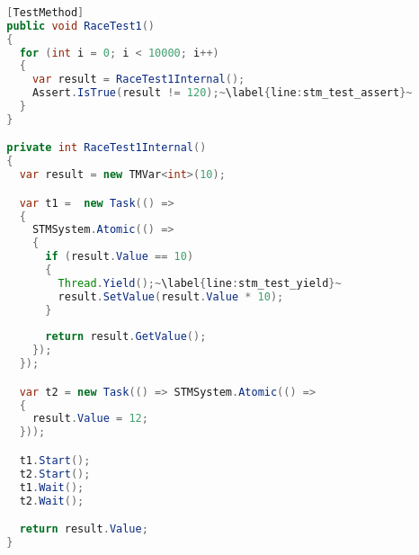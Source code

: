 \begin{lstlisting}[float,label=lst:stm_race_test,
  caption={RaceTest1},
  language=Java,  
  showspaces=false,
  showtabs=false,
  breaklines=true,
  showstringspaces=false,
  breakatwhitespace=true,
  escapechar=~,
  commentstyle=\color{greencomments},
  keywordstyle=\color{bluekeywords},
  stringstyle=\color{redstrings},
  morekeywords={atomic, retry, orelse, var, get, set, ref, out, Test}]  % Start your code-block
  
  [TestMethod]
  public void RaceTest1()
  {
    for (int i = 0; i < 10000; i++)
    {
      var result = RaceTest1Internal();
      Assert.IsTrue(result != 120);~\label{line:stm_test_assert}~
    }
  }

  private int RaceTest1Internal()
  {
    var result = new TMVar<int>(10);

    var t1 =  new Task(() =>
    {
      STMSystem.Atomic(() =>
      {
        if (result.Value == 10)
        {
          Thread.Yield();~\label{line:stm_test_yield}~
          result.SetValue(result.Value * 10);
        }
      
        return result.GetValue();
      });
    });

    var t2 = new Task(() => STMSystem.Atomic(() => 
    {
      result.Value = 12;
    }));

    t1.Start();
    t2.Start();
    t1.Wait();
    t2.Wait();

    return result.Value;
  }
\end{lstlisting}

\worksheetend
